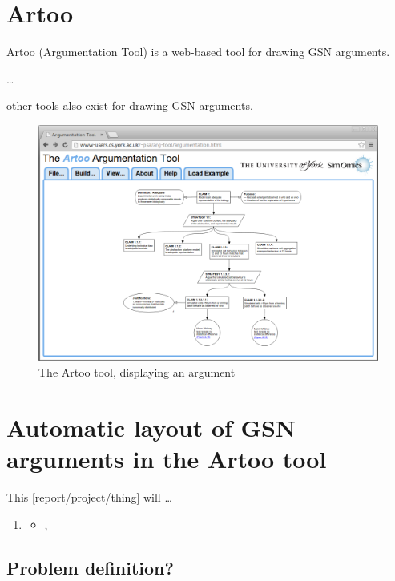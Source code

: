 \section{Artoo}

Artoo (Argumentation Tool) is a web-based tool for drawing GSN arguments.

\ldots

other tools also exist for drawing GSN arguments.

\begin{figure}
  \centering
  \includegraphics[width=\textwidth]{graphics/artoo_screenshot.png}
  \caption{The Artoo tool, displaying an argument }
\end{figure}




\section{Automatic layout of GSN arguments in the Artoo tool}

This [report/project/thing] will \ldots

  \begin{enumerate}
    \item
      \begin{itemize}
      \item ,
    \end{itemize}
  \end{enumerate}

\subsection{Problem definition?}

